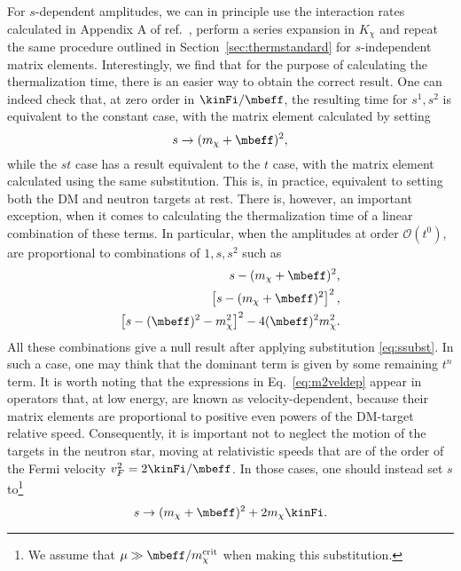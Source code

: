  For $s$-dependent amplitudes, we can in principle use the interaction rates calculated  in Appendix A of ref.~\cite{Bell:2020lmm}, perform a series expansion in $K_\chi$  and repeat the same procedure outlined in Section~\ref{sec:thermstandard} for $s$-independent matrix elements. Interestingly, we find that for the purpose of calculating the thermalization time, there is an easier way to obtain the correct result. One can indeed check that, at zero order in $\kinFi/\mbeff$, the resulting time for $s^1, s^2$ is equivalent to the constant case, with the matrix element calculated by setting 
\begin{equation}
    s\rightarrow (m_\chi+\mbeff)^2,
    \label{eq:ssubst}
\end{equation}
while the $s t $ case has a result equivalent to the $t$ case, with the matrix element calculated using the same substitution. This is, in practice, equivalent to setting both the DM and neutron targets at rest. There is, however, an important exception, when it comes to calculating the thermalization time of a linear combination of these terms. In particular, when the amplitudes at order $\mathcal{O}(t^0)$, are proportional to combinations of $1,s,s^2$ such as
\begin{eqnarray}
s-(m_\chi+\mbeff)^2,\nonumber\\
\left[s-(m_\chi+\mbeff)^2\right]^2,\nonumber\\
\left[s-(\mbeff)^2-m_\chi^2\right]^2-4(\mbeff)^2 m_\chi^2.\label{eq:m2veldep}
\end{eqnarray}
All these combinations give a null result after applying substitution \ref{eq:ssubst}. In such a case, one may think that the dominant term is given by some remaining $t^n$ term. It is worth noting that the expressions in  Eq.~\ref{eq:m2veldep}  appear in operators that, at low energy, are known as  velocity-dependent, because their matrix elements are proportional to positive even powers of the DM-target relative speed. Consequently, it is important not to neglect the motion of the targets in the neutron star, moving at relativistic speeds that are of the order of the Fermi velocity $v_F^2=2\kinFi/\mbeff$. In those cases, one should instead set $s$ to\footnote{We assume that $\mu\gg \mbeff/m_\chi^{\rm crit}$ when making this substitution.}
\begin{equation}
    s\rightarrow (m_\chi+\mbeff)^2+2m_\chi\kinFi.
    \label{eq:ssubstmu}
\end{equation}




